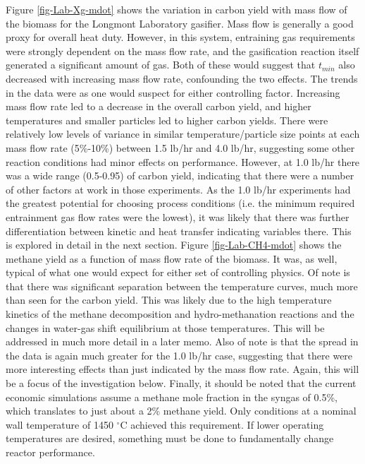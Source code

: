 \documentclass[11pt,twocolumn]{article}
\begin{document}
Figure \ref{fig-Lab-Xg-mdot} shows the variation in carbon yield with mass flow of the biomass for the Longmont Laboratory gasifier.  Mass flow is generally a good proxy for overall heat duty.  However, in this system, entraining gas requirements were strongly dependent on the mass flow rate, and the gasification reaction itself generated a significant amount of gas.  Both of these would suggest that $t_{min}$ also decreased with increasing mass flow rate, confounding the two effects.  The trends in the data were as one would suspect for either controlling factor.  Increasing mass flow rate led to a decrease in the overall carbon yield, and higher temperatures and smaller particles led to higher carbon yields.  There were relatively low levels of variance in similar temperature/particle size points at each mass flow rate (5\%-10\%) between 1.5 lb/hr and 4.0 lb/hr, suggesting some other reaction conditions had minor effects on performance.  However, at 1.0 lb/hr there was a wide range (0.5-0.95) of carbon yield, indicating that there were a number of other factors at work in those experiments.  As the 1.0 lb/hr experiments had the greatest potential for choosing process conditions (i.e. the minimum required entrainment gas flow rates were the lowest), it was likely that there was further differentiation between kinetic and heat transfer indicating variables there.  This is explored in detail in the next section.  Figure \ref{fig-Lab-CH4-mdot} shows the methane yield as a function of mass flow rate of the biomass.  It was, as well, typical of what one would expect for either set of controlling physics.  Of note is that there was significant separation between the temperature curves, much more than seen for the carbon yield.  This was likely due to the high temperature kinetics of the methane decomposition and hydro-methanation reactions and the changes in water-gas shift equilibrium at those temperatures.  This will be addressed in much more detail in a later memo.  Also of note is that the spread in the data is again much greater for the 1.0 lb/hr case, suggesting that there were more interesting effects than just indicated by the mass flow rate.  Again, this will be a focus of the investigation below.  Finally, it should be noted that the current economic simulations assume a methane mole fraction in the syngas of 0.5\%, which translates to just about a 2\% methane yield.  Only conditions at a nominal wall temperature of 1450 $^{\circ}$C achieved this requirement.  If lower operating temperatures are desired, something must be done to fundamentally change reactor performance.
\end{document}
